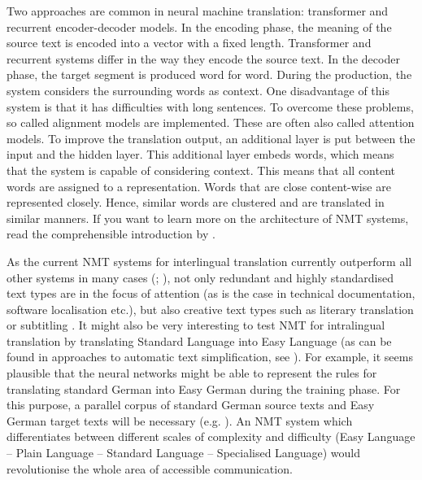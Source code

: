 Two approaches are common in neural machine translation: transformer and recurrent encoder-decoder models. In the encoding phase, the meaning of the source text is encoded into a vector with a fixed length. Transformer and recurrent systems differ in the way they encode the source text. In the decoder phase, the target segment is produced word for word. During the production, the system considers the surrounding words as context. One disadvantage of this system is that it has difficulties with long sentences. To overcome these problems, so called alignment models are implemented. These are often also called attention models. To improve the translation output, an additional layer is put between the input and the hidden layer. This additional layer embeds words, which means that the system is capable of considering context. This means that all content words are assigned to a representation. Words that are close content-wise are represented closely. Hence, similar words are clustered and are translated in similar manners. If you want to learn more on the architecture of NMT systems, read the comprehensible introduction by \citet{perez-ortiz_how_nodate}.

As the current NMT systems for interlingual translation currently outperform all other systems in many cases (\citealt{bentivogli2018neural}; \citealt{toral2017multifaceted}), not only redundant and highly standardised text types are in the focus of attention (as is the case in technical documentation, software localisation etc.), but also creative text types such as literary translation \citep{toral2018post} or subtitling \citep{tardel2020effort}. It might also be very interesting to test NMT for intralingual translation by translating Standard Language into Easy Language (as can be found in approaches to automatic text simplification, see \citealt{specia2010translating}). For example, it seems plausible that the neural networks might be able to represent the rules for translating standard German into Easy German during the training phase. For this purpose, a parallel corpus of standard German source texts and Easy German target texts will be necessary (e.g. \citealt{klaper2013building}). An NMT system which differentiates between different scales of complexity and difficulty (Easy Language -- Plain Language -- Standard Language -- Specialised Language) would revolutionise the whole area of accessible communication.

